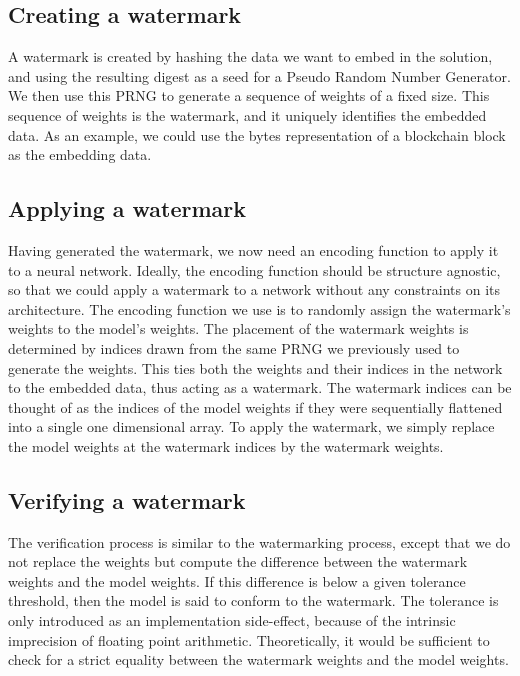\documentclass{article}
\begin{document}
\begin{multicols}{2}
	\subsection{Creating a watermark}

	A watermark is created by hashing the data we want to embed in the solution, and using the resulting digest as a seed for a Pseudo Random Number Generator. We then use this PRNG to generate a sequence of weights of a fixed size. This sequence of weights is the watermark, and it uniquely identifies the embedded data.
	As an example, we could use the bytes representation of a blockchain block as the embedding data.

	\subsection{Applying a watermark}

	Having generated the watermark, we now need an encoding function to apply it to a neural network. Ideally, the encoding function should be structure agnostic, so that we could apply a watermark to a network without any constraints on its architecture.
	The encoding function we use is to randomly assign the watermark's weights to the model's weights. The placement of the watermark weights is determined by indices drawn from the same PRNG we previously used to generate the weights. This ties both the weights and their indices in the network to the embedded data, thus acting as a watermark. The watermark indices can be thought of as the indices of the model weights if they were sequentially flattened into a single one dimensional array.
	To apply the watermark, we simply replace the model weights at the watermark indices by the watermark weights.

	\subsection{Verifying a watermark}

	The verification process is similar to the watermarking process, except that we do not replace the weights but compute the difference between the watermark weights and the model weights. If this difference is below a given tolerance threshold, then the model is said to conform to the watermark. The tolerance is only introduced as an implementation side-effect, because of the intrinsic imprecision of floating point arithmetic. Theoretically, it would be sufficient to check for a strict equality between the watermark weights and the model weights.


\end{multicols}
\end{document}
